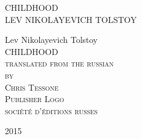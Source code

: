 
\newlength{\drop}\setlength{\drop}{0.12\textheight}

\newcommand*{\firsttitle}{\begingroup
\centering
\vspace*{3em}
{\Large CHILDHOOD}\\[\baselineskip]
{\Large LEV NIKOLAYEVICH TOLSTOY}
\vfill\null
\endgroup}

\newcommand*{\titleAM}{\begingroup
\centering
\vspace*{\drop}
{\large Lev Nikolayevich Tolstoy}\\[\baselineskip]
{\Huge CHILDHOOD}\\[\baselineskip]
{\scshape translated from the russian}\\
{\scshape by}\\
{\scshape Chris Tessone}\\[\drop]
{\scshape Publisher Logo}\\[0.5\baselineskip]
{\small\scshape soci\'et\'e d'\'editions russes}\par
{\small\scshape 2015}\par
\vfill\null
\endgroup}

\firsttitle
\thispagestyle{empty}
\clearpage

\newpage\null\thispagestyle{empty}\newpage

\titleAM
\thispagestyle{empty}
\clearpage 

